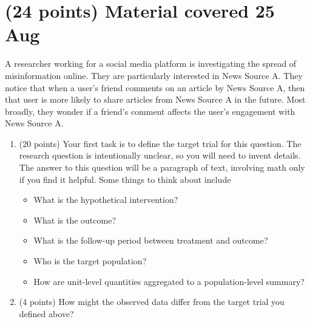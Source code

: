 \documentclass[10pt]{article}
\begin{document}
\section{(24 points) Material covered 25 Aug}

A researcher working for a social media platform is investigating the spread of misinformation online. They are particularly interested in News Source A. They notice that when a user's friend comments on an article by News Source A, then that user is more likely to share articles from News Source A in the future. Most broadly, they wonder if a friend's comment affects the user's engagement with News Source A.

\begin{enumerate}
    \item (20 points) Your first task is to define the target trial for this question. The research question is intentionally unclear, so you will need to invent details. The answer to this question will be a paragraph of text, involving math only if you find it helpful. Some things to think about include
    \begin{itemize}
        \item What is the hypothetical intervention?
        \item What is the outcome?
        \item What is the follow-up period between treatment and outcome?
        \item Who is the target population?
        \item How are unit-level quantities aggregated to a population-level summary?
    \end{itemize}
    \item (4 points) How might the observed data differ from the target trial you defined above?
\end{enumerate}
\end{document}

